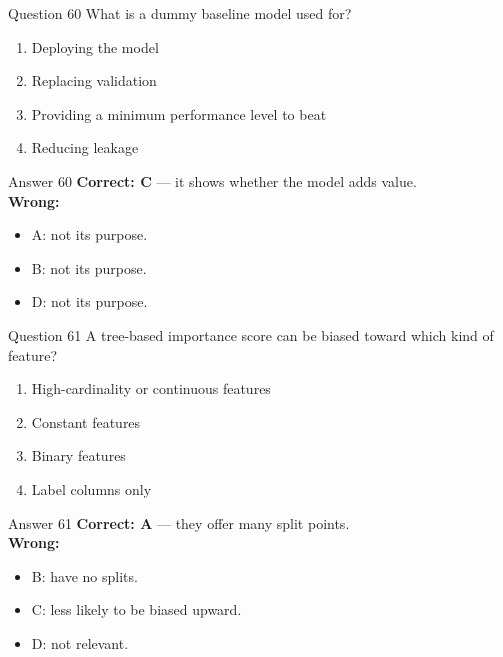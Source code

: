 \documentclass[aspectratio=169,11pt]{beamer}
\begin{document}
\begin{frame}{Question 60}
What is a dummy baseline model used for?
\begin{enumerate}[label=\Alph*.]
\item Deploying the model
\item Replacing validation
\item Providing a minimum performance level to beat
\item Reducing leakage
\end{enumerate}
\end{frame}
\begin{frame}{Answer 60}
\textbf{Correct: C} --- it shows whether the model adds value.\\
\vspace{0.5em}
\textbf{Wrong:}
\begin{itemize}
\item A: not its purpose.
\item B: not its purpose.
\item D: not its purpose.
\end{itemize}
\end{frame}

\begin{frame}{Question 61}
A tree-based importance score can be biased toward which kind of feature?
\begin{enumerate}[label=\Alph*.]
\item High-cardinality or continuous features
\item Constant features
\item Binary features
\item Label columns only
\end{enumerate}
\end{frame}
\begin{frame}{Answer 61}
\textbf{Correct: A} --- they offer many split points.\\
\vspace{0.5em}
\textbf{Wrong:}
\begin{itemize}
\item B: have no splits.
\item C: less likely to be biased upward.
\item D: not relevant.
\end{itemize}
\end{frame}
\end{document}
